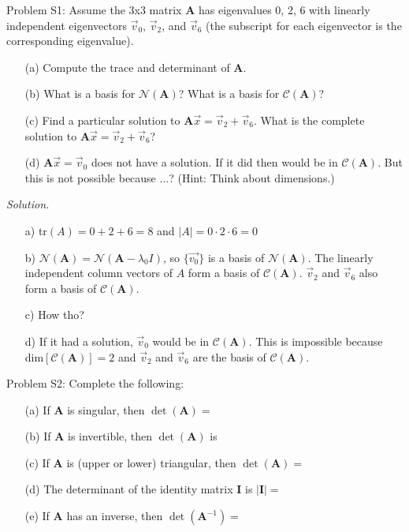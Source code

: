 \documentclass[12pt,pdftex]{article}
\begin{document}
\noindent Problem S1: Assume the 3x3 matrix $\mathbf{A}$ has eigenvalues 0, 2, 6 with linearly independent eigenvectors $\vec{v}_0$, $\vec{v}_2$, and $\vec{v}_6$ (the subscript for each eigenvector is the corresponding eigenvalue). 
\begin{itemize}
\item[(a)] Compute the trace and determinant of $\mathbf{A}$.
\item[(b)] What is a basis for $\mathcal{N}(\mathbf{A})$?  What is a basis for $\mathcal{C}(\mathbf{A})$?
\item[(c)] Find a particular solution to $\mathbf{A}\vec{x} = \vec{v}_2+\vec{v}_6$.  What is the complete solution to $\mathbf{A}\vec{x} = \vec{v}_2+\vec{v}_6$?
\item[(d)] $\mathbf{A}\vec{x}=\vec{v}_0$ does not have a solution.  If it did then \underline{\hspace{50pt}} would be in $\mathcal{C}(\mathbf{A})$.  But this is not possible because ...? (Hint: Think about dimensions.)
\end{itemize}

\textit{Solution.}
\begin{itemize}
\item[a)] tr$(A)=0+2+6=8$ and $|A|=0\cdot2\cdot6=0$
\item[b)] $\mathcal{N}(\mathbf{A})=\mathcal{N}(\mathbf{A}-\lambda_0I)$, so $\{\vec{v_0}\}$ is a basis of $
		  \mathcal{N}(\mathbf{A})$. The linearly independent column vectors of $A$ form a basis of $\mathcal{C}(\mathbf{A})$.
          $\vec{v}_2$ and $\vec{v}_6$ also form a basis of $\mathcal{C}(\mathbf{A})$.
\item[c)] How tho?
\item[d)] If it had a solution, $\vec{v}_0$ would be in $\mathcal{C}(\mathbf{A})$. This is impossible because dim$[\mathcal{C}(\mathbf{A})]=2$ and $\vec{v}_2$ and $\vec{v}_6$ are the basis of $\mathcal{C}(\mathbf{A})$.
\end{itemize}

\noindent Problem S2: Complete the following:
\begin{itemize}
\item[(a)] If $\mathbf{A}$ is singular, then $\det(\mathbf{A}) =$ \underline{\hspace{30pt}}
\item[(b)] If $\mathbf{A}$ is invertible, then $\det(\mathbf{A})$ is \underline{\hspace{30pt}}
\item[(c)] If $\mathbf{A}$ is (upper or lower) triangular, then $\det(\mathbf{A}) =$ \underline{\hspace{30pt}}
\item[(d)] The determinant of the identity matrix $\mathbf{I}$ is $|\mathbf{I}| =$ \underline{\hspace{30pt}}
\item[(e)] If $\mathbf{A}$ has an inverse, then $\det(\mathbf{A}^{-1}) =$ \underline{\hspace{30pt}}
\end{itemize}
\end{document}
